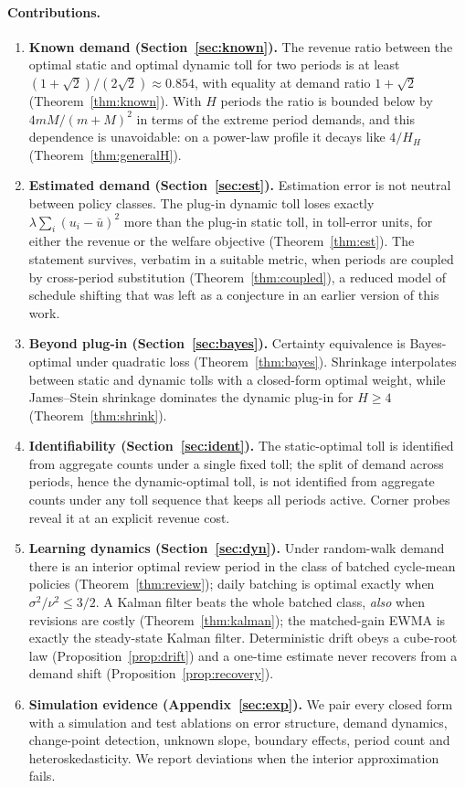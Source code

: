 \documentclass[11pt]{article}
\theoremstyle{definition}
\theoremstyle{remark}
\begin{document}
\paragraph{Contributions.}
\begin{enumerate}
\item \textbf{Known demand (Section~\ref{sec:known}).} The revenue ratio between the optimal static and optimal dynamic toll for two periods is at least $(1+\sqrt2)/(2\sqrt2)\approx0.854$, with equality at demand ratio $1+\sqrt2$ (Theorem~\ref{thm:known}). With $H$ periods the ratio is bounded below by $4mM/(m+M)^2$ in terms of the extreme period demands, and this dependence is unavoidable: on a power-law profile it decays like $4/H_H$ (Theorem~\ref{thm:generalH}).
\item \textbf{Estimated demand (Section~\ref{sec:est}).} Estimation error is not neutral between policy classes. The plug-in dynamic toll loses exactly $\lambda\sum_i(u_i-\bar u)^2$ more than the plug-in static toll, in toll-error units, for either the revenue or the welfare objective (Theorem~\ref{thm:est}). The statement survives, verbatim in a suitable metric, when periods are coupled by cross-period substitution (Theorem~\ref{thm:coupled}), a reduced model of schedule shifting that was left as a conjecture in an earlier version of this work.
\item \textbf{Beyond plug-in (Section~\ref{sec:bayes}).} Certainty equivalence is Bayes-optimal under quadratic loss (Theorem~\ref{thm:bayes}). Shrinkage interpolates between static and dynamic tolls with a closed-form optimal weight, while James--Stein shrinkage dominates the dynamic plug-in for $H\ge4$ (Theorem~\ref{thm:shrink}).
\item \textbf{Identifiability (Section~\ref{sec:ident}).} The static-optimal toll is identified from aggregate counts under a single fixed toll; the split of demand across periods, hence the dynamic-optimal toll, is not identified from aggregate counts under any toll sequence that keeps all periods active. Corner probes reveal it at an explicit revenue cost.
\item \textbf{Learning dynamics (Section~\ref{sec:dyn}).} Under random-walk demand there is an interior optimal review period in the class of batched cycle-mean policies (Theorem~\ref{thm:review}); daily batching is optimal exactly when $\sigma^2/\nu^2\le3/2$. A Kalman filter beats the whole batched class, \emph{also} when revisions are costly (Theorem~\ref{thm:kalman}); the matched-gain EWMA is exactly the steady-state Kalman filter. Deterministic drift obeys a cube-root law (Proposition~\ref{prop:drift}) and a one-time estimate never recovers from a demand shift (Proposition~\ref{prop:recovery}).
\item \textbf{Simulation evidence (Appendix~\ref{sec:exp}).} We pair every closed form with a simulation and test ablations on error structure, demand dynamics, change-point detection, unknown slope, boundary effects, period count and heteroskedasticity. We report deviations when the interior approximation fails.
\end{enumerate}
\end{document}
